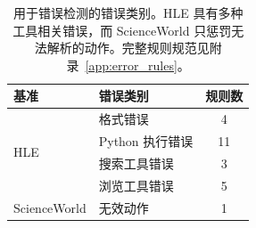 \begin{table}[t]
\centering
\small
\begin{tabular}{llc}
\toprule
\textbf{基准} & \textbf{错误类别} & \textbf{规则数} \\
\midrule
\multirow{4}{*}{HLE} & 格式错误 & 4 \\
 & Python 执行错误 & 11 \\
 & 搜索工具错误 & 3 \\
 & 浏览工具错误 & 5 \\
\midrule
ScienceWorld & 无效动作 & 1 \\
\bottomrule
\end{tabular}
\caption{用于错误检测的错误类别。HLE 具有多种工具相关错误，而 ScienceWorld 只惩罚无法解析的动作。完整规则规范见附录~\ref{app:error_rules}。}
\label{tab:error_categories}
\vspace{-1.0em}
\end{table}

